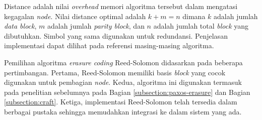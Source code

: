 Distance adalah nilai \textit{overhead} memori algoritma tersebut dalam mengatasi kegagalan \textit{node}. Nilai distance optimal adalah $k + m = n$ dimana $k$ adalah jumlah \textit{data block}, $m$ adalah jumlah \textit{parity block}, dan $n$ adalah jumlah total \textit{block} yang dibutuhkan. Simbol yang sama digunakan untuk redundansi. Penjelasan implementasi dapat dilihat pada referensi masing-masing algoritma.

Pemilihan algoritma \textit{erasure coding} Reed-Solomon didasarkan pada beberapa pertimbangan. Pertama, Reed-Solomon memiliki basis \textit{block} yang cocok digunakan untuk pembagian \textit{node}. Kedua, algoritma ini digunakan termasuk pada penelitian sebelumnya pada Bagian \ref{subsection:paxos-erasure} dan Bagian \ref{subsection:craft}. Ketiga, implementasi Reed-Solomon telah tersedia dalam berbagai pustaka sehingga memudahkan integrasi ke dalam sistem yang ada.